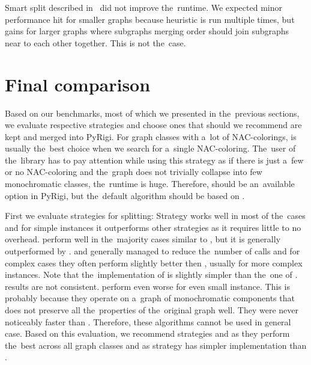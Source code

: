 Smart split described in~
did not improve the~runtime.
We expected minor performance hit for smaller graphs because heuristic is run
multiple times, but gains for larger graphs where subgraphs merging order
should join subgraphs near to each other together. This is not the~case.

\section{Final comparison}

Based on our benchmarks, most of which we presented in the~previous sections,
we evaluate respective strategies and choose ones
that should we recommend are kept and merged into PyRigi.
%
For graph classes with a~lot of NAC-colorings,
\NaiveCycles{} is usually the~best choice
when we search for a~single NAC-coloring.
%
The~user of the~library has to pay attention while using this strategy
as if there is just a~few or no NAC-coloring and the~graph does not trivially collapse
into few monochromatic classes, the~runtime is huge.
Therefore, \NaiveCycles{} should be an~available option in PyRigi,
but the~default algorithm should be based on \Subgraphs{}.

First we evaluate strategies for splitting:
Strategy \None{} works well in most of the~cases and for simple
instances it outperforms other strategies as it requires little to no overhead.
%
\CyclesMatchChunks{} perform well in the~majority cases similar to \None{},
but it is generally outperformed by \Neighbors{}.
%
\Neighbors{} and \NeighborsDegree{} generally managed to reduce the~number
of \IsNACColoring{} calls and for complex cases they often
perform slightly better then \None{}, usually for more complex instances.
Note that the~implementation of \Neighbors{} is slightly simpler than
the~one of \NeighborsDegree{}.
%
\KernighanLin{} results are not consistent.
\Cuts{} perform even worse for even small instance.
This is probably because they operate on a~graph of monochromatic
components that does not preserve all the~properties
of the~original graph well.
They were never noticeably faster than \Neighbors{}.
Therefore, these algorithms cannot be used in general case.
%
Based on this evaluation, we recommend strategies \None{} and \Neighbors{}
as they perform the~best across all graph classes and
as \Neighbors{} strategy has simpler implementation than \NeighborsDegree{}.

